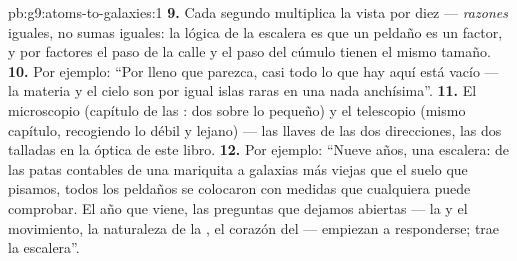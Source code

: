 \begin{solution}{pb:g9:atoms-to-galaxies:1}
\textbf{9.} Cada segundo multiplica la vista por diez --- \emph{razones}
iguales, no sumas iguales: la lógica de la escalera es que un peldaño
es un factor, y por factores el paso de la calle y el paso del cúmulo
tienen el mismo tamaño.
\textbf{10.} Por ejemplo: ``Por lleno que parezca, casi todo lo que hay
aquí está vacío --- la materia y el cielo son por igual islas raras en
una nada anchísima''.
\textbf{11.} El microscopio (capítulo de las : dos
 sobre lo pequeño) y el telescopio (mismo
capítulo, recogiendo lo débil y lejano) --- las llaves de las dos
direcciones, las dos talladas en la óptica de este libro.
\textbf{12.} Por ejemplo: ``Nueve años, una escalera: de las patas
contables de una mariquita a galaxias más viejas que el suelo que
pisamos, todos los peldaños se colocaron con medidas que cualquiera
puede comprobar. El año que viene, las preguntas que dejamos abiertas
--- la  y el movimiento, la naturaleza de la
, el corazón del  --- empiezan a responderse;
trae la escalera''.
\end{solution}
